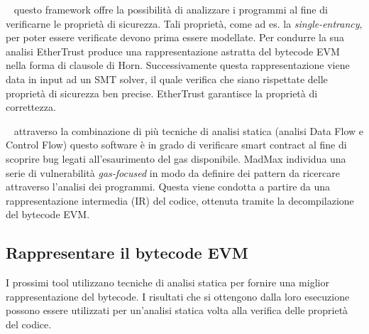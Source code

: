 \begin{description}[labelindent=1cm]    %

    \item[EtherTrust] ~\cite{grishchenko2018foundations} questo framework offre la possibilità di analizzare i programmi al fine di verificarne le proprietà di sicurezza. Tali proprietà, come ad es. la \textit{single-entrancy}, per poter essere verificate devono prima essere modellate.\newline
    \indent Per condurre la sua analisi EtherTrust produce una rappresentazione astratta del bytecode EVM nella forma di clausole di Horn. Successivamente questa rappresentazione viene data in input ad un SMT solver, il quale verifica che siano rispettate delle proprietà di sicurezza ben precise. EtherTrust garantisce la proprietà di correttezza.\newline

    \item[MadMax] ~\cite{grech2018madmax} attraverso la combinazione di più tecniche di analisi statica (analisi Data Flow e Control Flow) questo software è in grado di verificare smart contract al fine di scoprire bug legati all'esaurimento del gas disponibile.\newline
    \indent MadMax individua una serie di vulnerabilità \textit{gas-focused} in modo da definire dei pattern da ricercare attraverso l'analisi dei programmi. Questa viene condotta a partire da una rappresentazione intermedia (IR) del codice, ottenuta tramite la decompilazione del bytecode EVM.\newline

\end{description}

\subsection{Rappresentare il bytecode EVM}

I prossimi tool utilizzano tecniche di analisi statica per fornire una miglior rappresentazione del bytecode. I risultati che si ottengono dalla loro esecuzione possono essere utilizzati per un'analisi statica volta alla verifica delle proprietà del codice.\newline

